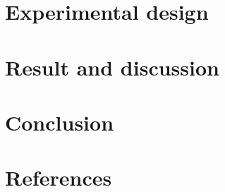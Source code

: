 \documentclass[]{elsarticle} %
\begin{document}
\hypertarget{design}{%
\section{Experimental design}\label{design}}

\hypertarget{result}{%
\section{Result and discussion}\label{result}}

\hypertarget{conclusion}{%
\section{Conclusion}\label{conclusion}}

\hypertarget{references}{%
\section*{References}\label{references}}
\end{document}
